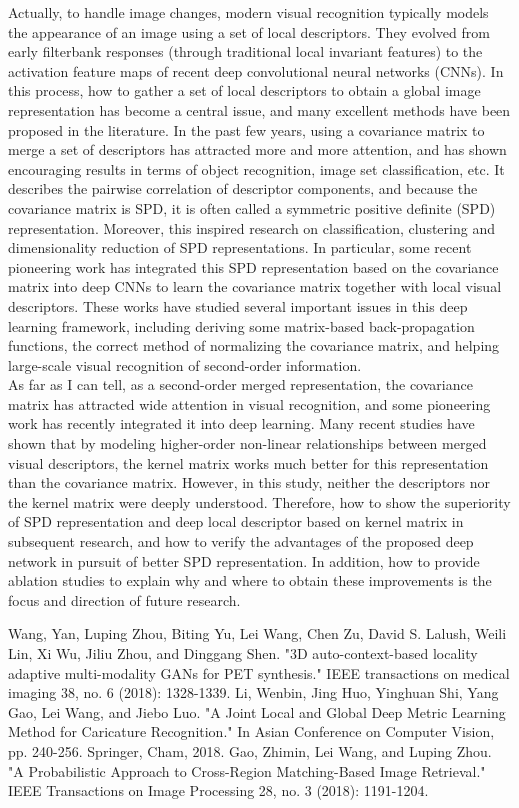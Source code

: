 \documentclass[12pt, a4paper]{article}
\begin{document}
Actually, to handle image changes, modern visual recognition typically models the appearance of an image using a set of local descriptors. They evolved from early filterbank responses (through traditional local invariant features) to the activation feature maps of recent deep convolutional neural networks (CNNs). In this process, how to gather a set of local descriptors to obtain a global image representation has become a central issue, and many excellent methods have been proposed in the literature. In the past few years, using a covariance matrix to merge a set of descriptors has attracted more and more attention, and has shown encouraging results in terms of object recognition, image set classification, etc. It describes the pairwise correlation of descriptor components, and because the covariance matrix is ​​SPD, it is often called a symmetric positive definite (SPD) representation. Moreover, this inspired research on classification, clustering and dimensionality reduction of SPD representations. In particular, some recent pioneering work has integrated this SPD representation based on the covariance matrix into deep CNNs to learn the covariance matrix together with local visual descriptors. These works have studied several important issues in this deep learning framework, including deriving some matrix-based back-propagation functions, the correct method of normalizing the covariance matrix, and helping large-scale visual recognition of second-order information.\\
As far as I can tell, as a second-order merged representation, the covariance matrix has attracted wide attention in visual recognition, and some pioneering work has recently integrated it into deep learning. Many recent studies have shown that by modeling higher-order non-linear relationships between merged visual descriptors, the kernel matrix works much better for this representation than the covariance matrix. However, in this study, neither the descriptors nor the kernel matrix were deeply understood. Therefore, how to show the superiority of SPD representation and deep local descriptor based on kernel matrix in subsequent research, and how to verify the advantages of the proposed deep network in pursuit of better SPD representation. In addition, how to provide ablation studies to explain why and where to obtain these improvements is the focus and direction of future research.

\begin{thebibliography}{9}
 Wang, Yan, Luping Zhou, Biting Yu, Lei Wang, Chen Zu, David S. Lalush, Weili Lin, Xi Wu, Jiliu Zhou, and Dinggang Shen. "3D auto-context-based locality adaptive multi-modality GANs for PET synthesis." IEEE transactions on medical imaging 38, no. 6 (2018): 1328-1339.
 Li, Wenbin, Jing Huo, Yinghuan Shi, Yang Gao, Lei Wang, and Jiebo Luo. "A Joint Local and Global Deep Metric Learning Method for Caricature Recognition." In Asian Conference on Computer Vision, pp. 240-256. Springer, Cham, 2018.
 Gao, Zhimin, Lei Wang, and Luping Zhou. "A Probabilistic Approach to Cross-Region Matching-Based Image Retrieval." IEEE Transactions on Image Processing 28, no. 3 (2018): 1191-1204.


\end{thebibliography}
\end{document}
